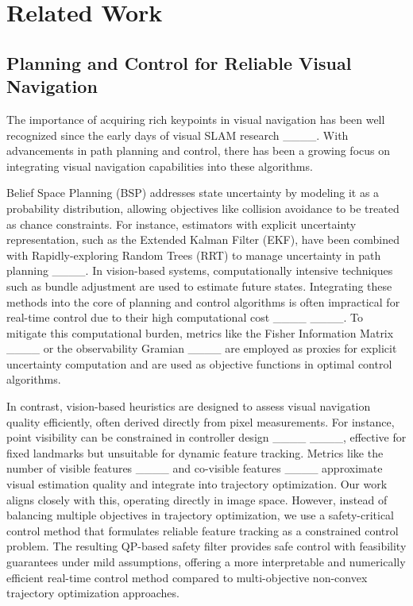 \section{Related Work}
\subsection{Planning and Control for Reliable Visual Navigation}


The importance of acquiring rich keypoints in visual navigation has been well recognized since the early days of visual SLAM research ____. With advancements in path planning and control, there has been a growing focus on integrating visual navigation capabilities into these algorithms.


Belief Space Planning (BSP) addresses state uncertainty by modeling it as a probability distribution, allowing objectives like collision avoidance to be treated as chance constraints. For instance, estimators with explicit uncertainty representation, such as the Extended Kalman Filter (EKF), have been combined with Rapidly-exploring Random Trees (RRT) to manage uncertainty in path planning ____. 
In vision-based systems, computationally intensive techniques such as bundle adjustment are used to estimate future states. Integrating these methods into the core of planning and control algorithms is often impractical for real-time control due to their high computational cost ____ ____. To mitigate this computational burden, metrics like the Fisher Information Matrix ____ or the observability Gramian ____ are employed as proxies for explicit uncertainty computation and are used as objective functions in optimal control algorithms.


In contrast, vision-based heuristics are designed to assess visual navigation quality efficiently, often derived directly from pixel measurements. For instance, point visibility can be constrained in controller design ____ ____, effective for fixed landmarks but unsuitable for dynamic  feature tracking. Metrics like the number of visible features ____ and co-visible features ____ approximate visual estimation quality and integrate into trajectory optimization. Our work aligns closely with this, operating directly in image space. However, instead of balancing multiple objectives in trajectory optimization, we use a safety-critical control method that formulates reliable feature tracking as a constrained control problem.
The resulting QP-based safety filter provides safe control with feasibility guarantees under mild assumptions, offering a more interpretable and numerically efficient real-time control method compared to multi-objective non-convex trajectory optimization approaches.


